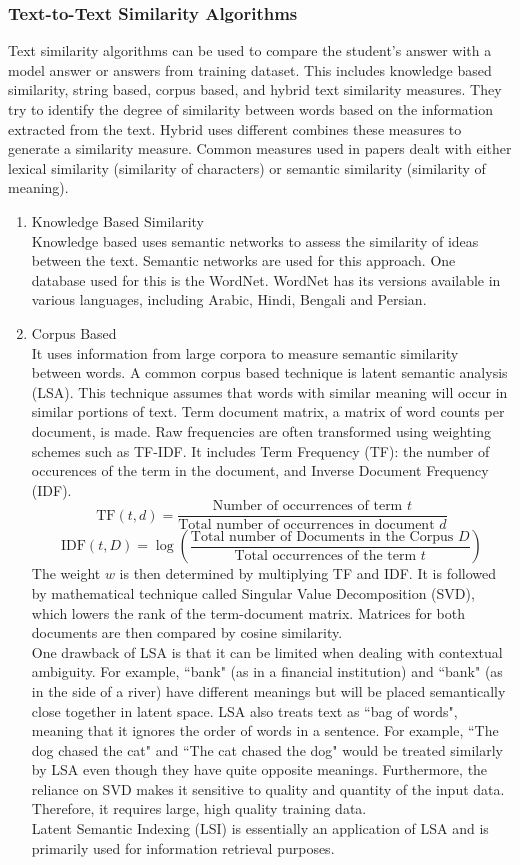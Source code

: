 \documentclass{article}
\begin{document}
\subsubsection*{Text-to-Text Similarity Algorithms}
Text similarity algorithms can be used to compare the student's answer with a model answer or answers from training dataset. This includes knowledge based similarity, string based, corpus based, and hybrid text similarity measures. They try to identify the degree of similarity between words based on the information extracted from the text. Hybrid uses different combines these measures to generate a similarity measure. Common measures used in papers dealt with either lexical similarity (similarity of characters) or semantic similarity (similarity of meaning).
\begin{enumerate}
	\item Knowledge Based Similarity \\ Knowledge based uses semantic networks to assess the similarity of ideas between the text. Semantic networks are used for this approach. One database used for this is the WordNet. WordNet has its versions available in various languages, including Arabic, Hindi, Bengali and Persian. 
	\item Corpus Based \\ It uses information from large corpora to measure semantic similarity between words. A common corpus based technique is latent semantic analysis (LSA). This technique assumes that words with similar meaning will occur in similar portions of text. Term document matrix, a matrix of word counts per document, is made. Raw frequencies are often transformed using weighting schemes such as TF-IDF. It includes Term Frequency (TF): the number of occurences of the term in the document, and Inverse Document Frequency (IDF).
	$$\text{TF}(t, d) = \frac{\text{Number of occurrences of term }t}{\text{Total number of occurrences in document }d} $$
	$$\text{IDF}(t, D) = \log \left( \frac{\text{Total number of Documents in the Corpus }D}{\text{Total occurrences of the term }t} \right) $$
	The weight $w$ is then determined by multiplying TF and IDF.
	It is followed by mathematical technique called Singular Value Decomposition (SVD), which lowers the rank of the term-document matrix. Matrices for both documents are then compared by cosine similarity. \\ One drawback of LSA is that it can be limited when dealing with contextual ambiguity. For example, ``bank" (as in a financial institution) and ``bank" (as in the side of a river) have different meanings but will be placed semantically close together in latent space. LSA also treats text as ``bag of words", meaning that it ignores the order of words in a sentence. For example, ``The dog chased the cat" and ``The cat chased the dog" would be treated similarly by LSA even though they have quite opposite meanings. Furthermore, the reliance on SVD makes it sensitive to quality and quantity of the input data. Therefore, it requires large, high quality training data. \\ Latent Semantic Indexing (LSI) is essentially an application of LSA and is primarily used for information retrieval purposes. \\ 

\end{enumerate}
\end{document}
